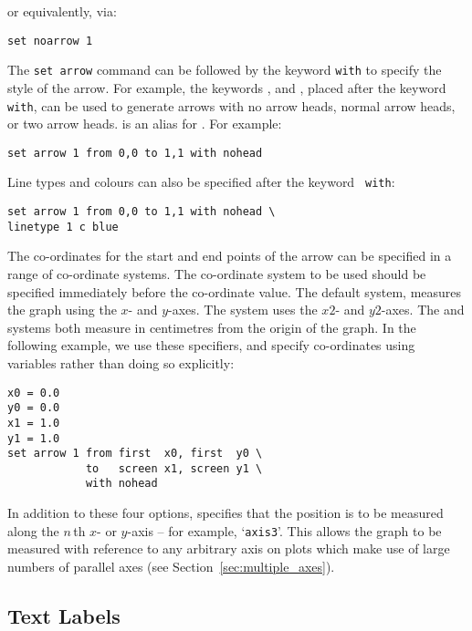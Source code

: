 \noindent or equivalently, via:

\begin{verbatim}
set noarrow 1
\end{verbatim}

The {\tt set arrow} command can be followed by the keyword {\tt with} to
specify the style of the arrow. For example, the keywords ,
 and , placed after the keyword {\tt with}, can
be used to generate arrows with no arrow heads, normal arrow heads, or two
arrow heads.   is an alias for .  For example:

\begin{verbatim}
set arrow 1 from 0,0 to 1,1 with nohead
\end{verbatim}

\noindent Line types and colours can also be specified after the keyword {\tt
with}:

\begin{verbatim}
set arrow 1 from 0,0 to 1,1 with nohead \
linetype 1 c blue
\end{verbatim}

The co-ordinates for the start and end points of the arrow can be specified in
a range of co-ordinate systems. The co-ordinate system to be used should be
specified immediately before the co-ordinate value. The default system,
\indcot{first} measures the graph using the $x$- and $y$-axes. The
\indcot{second} system uses the $x2$- and $y2$-axes. The  and
\indcot{graph} systems both measure in centimetres from the origin of the
graph. In the following example, we use these specifiers, and specify
co-ordinates using variables rather than doing so explicitly:

\begin{verbatim}
x0 = 0.0
y0 = 0.0
x1 = 1.0
y1 = 1.0
set arrow 1 from first  x0, first  y0 \
            to   screen x1, screen y1 \
            with nohead
\end{verbatim}

In addition to these four options,  specifies that the
position is to be measured along the $n\,$th $x$- or $y$-axis -- for example,
`{\tt axis3}'. This allows the graph to be measured with
reference to any arbitrary axis on plots which make use of large numbers of
parallel axes (see Section~\ref{sec:multiple_axes}).

\subsection{Text Labels}

